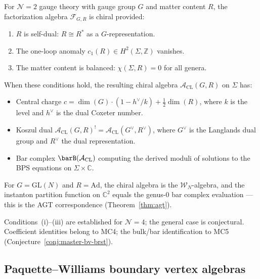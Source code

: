 \begin{conjecture}
\label{conj:cl-general-chirality}
For $\mathcal{N}=2$ gauge theory with gauge group $G$ and matter content $R$,
the factorization algebra $\mathcal{F}_{G,R}$ is chiral provided:
\begin{enumerate}[label=\textup{(\roman*)}]
\item $R$ is self-dual: $R \cong R^*$ as a $G$-representation.
\item The one-loop anomaly $c_1(R) \in H^2(\Sigma, \mathbb{Z})$ vanishes.
\item The matter content is balanced: $\chi(\Sigma, R) = 0$ for all genera.
\end{enumerate}
When these conditions hold, the resulting chiral algebra $\mathcal{A}_{\mathrm{CL}}(G, R)$
on $\Sigma$ has:
\begin{itemize}
\item Central charge $c = \dim(G) \cdot (1 - h^\vee/k) + \tfrac{1}{2}\dim(R)$,
  where $k$ is the level and $h^\vee$ is the dual Coxeter number.
\item Koszul dual $\mathcal{A}_{\mathrm{CL}}(G, R)^! = \mathcal{A}_{\mathrm{CL}}(G^\vee, R^\vee)$,
  where $G^\vee$ is the Langlands dual group and $R^\vee$ the dual representation.
\item Bar complex $\barB(\mathcal{A}_{\mathrm{CL}})$ computing the derived moduli
  of solutions to the BPS equations on $\Sigma \times \mathbb{C}$.
\end{itemize}
For $G = \mathrm{GL}(N)$ and $R = \mathrm{Ad}$, the chiral algebra is the
$\mathcal{W}_N$-algebra, and the instanton partition function on $\mathbb{C}^2$
equals the genus-$0$ bar complex evaluation --- this is the AGT correspondence
(Theorem~\ref{thm:agt}).
\end{conjecture}

\begin{remark}[Scope]
Conditions~(i)--(iii) are established for $\mathcal{N}=4$; the general case is conjectural.  Coefficient identities belong to MC4; the bulk/bar identification to MC5 (Conjecture~\ref{conj:master-bv-brst}).
\end{remark}

\subsection{Paquette--Williams boundary vertex algebras}

